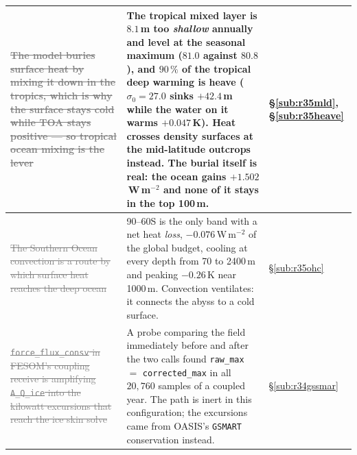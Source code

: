 \documentclass[10pt]{article}
\newcommand{\dead}[1]{\textcolor{gray}{\sout{#1}}}
\begin{document}
\begin{center}
\begin{tabular}{p{} p{} l}
\dead{The model buries surface heat by mixing it down in the tropics, which is why the
surface stays cold while TOA stays positive --- so tropical ocean mixing is the lever} &
The tropical mixed layer is $8.1$\,m too \emph{shallow} annually and level at the
seasonal maximum ($81.0$ against $80.8$), and $90\,\%$ of the tropical deep warming is
heave ($\sigma_0=27.0$ sinks $+42.4$\,m while the water on it warms $+0.047$\,K). Heat
crosses density surfaces at the mid-latitude outcrops instead. The burial itself is real:
the ocean gains $+1.502$\,W\,m$^{-2}$ and none of it stays in the top 100\,m. &
\S\ref{sub:r35mld}, \S\ref{sub:r35heave} \\
\midrule

\dead{The Southern Ocean convection is a route by which surface heat reaches the deep
ocean} &
90--60S is the only band with a net heat \emph{loss}, $-0.076$\,W\,m$^{-2}$ of the global
budget, cooling at every depth from 70 to 2400\,m and peaking $-0.26$\,K near 1000\,m.
Convection ventilates: it connects the abyss to a cold surface. &
\S\ref{sub:r35ohc} \\
\midrule

\dead{\texttt{force\_flux\_consv} in FESOM's coupling receive is amplifying
\texttt{A\_Q\_ice} into the kilowatt excursions that reach the ice skin solve} &
A probe comparing the field immediately before and after the two calls found
\texttt{raw\_max} $=$ \texttt{corrected\_max} in all $20{,}760$ samples of a coupled
year. The path is inert in this configuration; the excursions came from OASIS's
\texttt{GSMART} conservation instead. &
\S\ref{sub:r34gssmar} \\
\midrule


\end{tabular}
\end{center}
\end{document}
